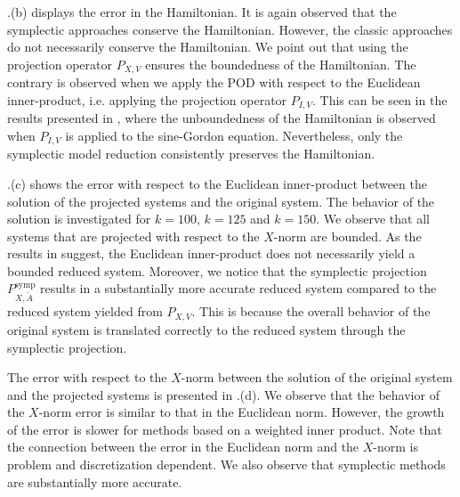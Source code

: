 .(b) displays the error in the Hamiltonian. It is again observed that the symplectic approaches conserve the Hamiltonian. However, the classic approaches do not necessarily conserve the Hamiltonian. We point out that using the projection operator $P_{X,V}$ ensures the boundedness of the Hamiltonian. The contrary is observed when we apply the POD with respect to the Euclidean inner-product, i.e. applying the projection operator $P_{I,V}$. This can be seen in the results presented in \cite{doi:10.1137/140978922}, where the unboundedness of the Hamiltonian is observed when $P_{I,V}$ is applied to the sine-Gordon equation. Nevertheless, only the symplectic model reduction consistently preserves the Hamiltonian.

.(c) shows the error with respect to the Euclidean inner-product between the solution of the projected systems and the original system. The behavior of the solution is investigated for $k=100$, $k=125$ and $k=150$. We observe that all systems that are projected with respect to the $X$-norm are bounded. As the results in \cite{doi:10.1137/140978922} suggest, the Euclidean inner-product does not necessarily yield a bounded reduced system. Moreover, we notice that the symplectic projection $P^{\text{symp}}_{X,\tilde A}$ results in a substantially more accurate reduced system compared to the reduced system yielded from $P_{X,V}$. This is because the overall behavior of the original system is translated correctly to the reduced system through the symplectic projection.

The error with respect to the $X$-norm between the solution of the original system and the projected systems is presented in .(d). We observe that the behavior of the $X$-norm error is similar to that in the Euclidean norm. However, the growth of the error is slower for methods based on a weighted inner product. Note that the connection between the error in the Euclidean norm and the $X$-norm is problem and discretization dependent. We also observe that symplectic methods are substantially more accurate.


